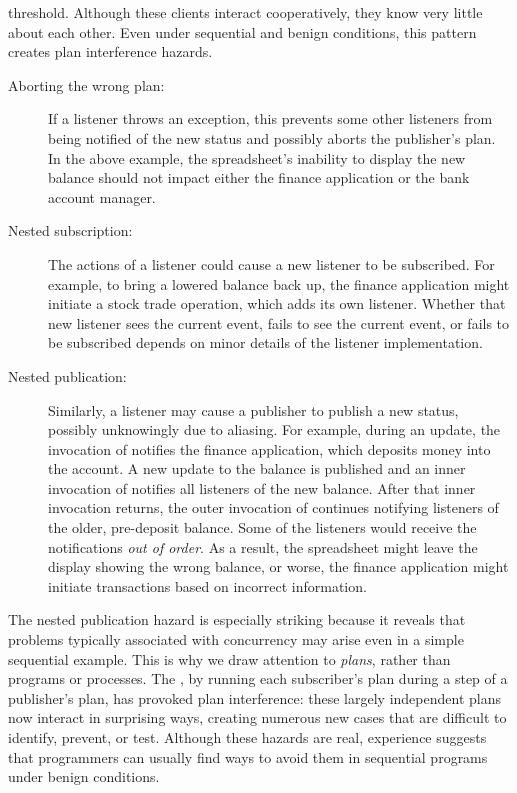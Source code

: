 \documentclass{llncs}
\begin{document}
threshold.  Although these clients interact cooperatively, they know
very little about each other. Even under sequential and benign
conditions, this pattern creates plan interference hazards.
%
\begin{description}

\item[Aborting the wrong plan:] 

If a listener throws an exception, this prevents some other listeners
from being notified of the new status and possibly aborts the
publisher's plan. In the above example, the spreadsheet's inability to
display the new balance should not impact either the finance
application or the bank account manager.

\item[Nested subscription:] 

The actions of a listener could cause a new listener to be subscribed.
For example, to bring a lowered balance back up, the finance
application might initiate a stock trade operation, which adds its own
listener.  Whether that new listener sees the current event, fails to
see the current event, or fails to be subscribed depends on minor
details of the listener implementation.

\item[Nested publication:] 

Similarly, a listener may cause a publisher to publish a new status,
possibly unknowingly due to aliasing.  For example, during an update,
the invocation of  notifies the finance application,
which deposits money into the account. A new update to the balance is
published and an inner invocation of  notifies all
listeners of the new balance.  After that inner invocation returns,
the outer invocation of  continues notifying listeners
of the older, pre-deposit balance.  Some of the listeners would
receive the notifications \emph{out of order}.  As a result, the
spreadsheet might leave the display showing the wrong balance, or
worse, the finance application might initiate transactions based on
incorrect information.

\end{description}
%
The nested publication hazard is especially striking because it
reveals that problems typically associated with concurrency may arise
even in a simple sequential example. This is why we draw attention to
\emph{plans}, rather than programs or processes. The
, by running each subscriber's plan during a step
of a publisher's plan, has provoked plan interference: these largely
independent plans now interact in surprising ways, creating numerous
new cases that are difficult to identify, prevent, or test. Although
these hazards are real, experience suggests that programmers can
usually find ways to avoid them in sequential programs under benign
conditions.
\end{document}
